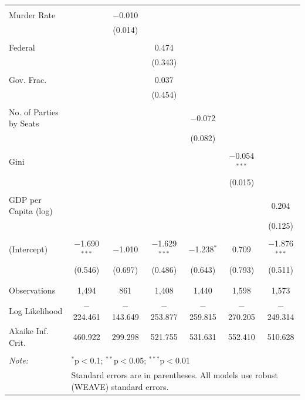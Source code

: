 \documentclass[a4paper]{article}\usepackage[]{graphicx}\usepackage[]{color}
\begin{document}
\begin{table}
\begin{center}
{\begin{tabular}{@{\extracolsep{5pt}}lcccccc}
  & & & & & & \\ 
 Murder Rate &  & $-$0.010 &  &  &  &  \\ 
  &  & (0.014) &  &  &  &  \\ 
  & & & & & & \\ 
 Federal &  &  & 0.474 &  &  &  \\ 
  &  &  & (0.343) &  &  &  \\ 
  & & & & & & \\ 
 Gov. Frac. &  &  & 0.037 &  &  &  \\ 
  &  &  & (0.454) &  &  &  \\ 
  & & & & & & \\ 
 No. of Parties by Seats &  &  &  & $-$0.072 &  &  \\ 
  &  &  &  & (0.082) &  &  \\ 
  & & & & & & \\ 
 Gini &  &  &  &  & $-$0.054$^{***}$ &  \\ 
  &  &  &  &  & (0.015) &  \\ 
  & & & & & & \\ 
 GDP per Capita (log) &  &  &  &  &  & 0.204 \\ 
  &  &  &  &  &  & (0.125) \\ 
  & & & & & & \\ 
 (Intercept) & $-$1.690$^{***}$ & $-$1.010 & $-$1.629$^{***}$ & $-$1.238$^{*}$ & 0.709 & $-$1.876$^{***}$ \\ 
  & (0.546) & (0.697) & (0.486) & (0.643) & (0.793) & (0.511) \\ 
  & & & & & & \\ 
\hline \\[-1.8ex] 
Observations & 1,494 & 861 & 1,408 & 1,440 & 1,598 & 1,573 \\ 
Log Likelihood & $-$224.461 & $-$143.649 & $-$253.877 & $-$259.815 & $-$270.205 & $-$249.314 \\ 
Akaike Inf. Crit. & 460.922 & 299.298 & 521.755 & 531.631 & 552.410 & 510.628 \\ 
\hline 
\hline \\[-1.8ex] 
\textit{Note:}  & \multicolumn{6}{l}{$^{*}$p$<$0.1; $^{**}$p$<$0.05; $^{***}$p$<$0.01} \\ 
 & \multicolumn{6}{l}{Standard errors are in parentheses. All models use robust (WEAVE) standard errors.} \\ 
\end{tabular} 

}
\end{center}
\end{table}
\end{document}
